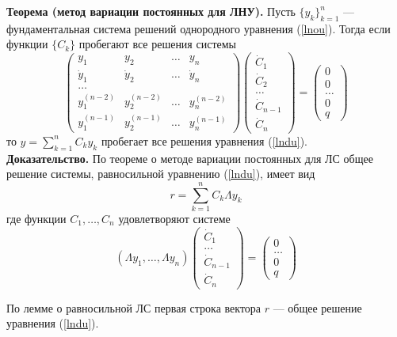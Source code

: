 \noindent \textbf{Теорема (метод вариации постоянных для ЛНУ).} Пусть $\{y_k\}_{k=1}^n$ --- фундаментальная система решений однородного уравнения (\ref{lnou}). Тогда если функции $\{C_k\}$ пробегают все решения системы
\begin{equation*}
    \begin{pmatrix}
    y_1 & y_2 & \ldots & y_n\\
    \dot{y}_1 & \dot{y}_2 & \ldots & \dot{y}_n\\
    \ldots\\
    y_1^{(n-2)} & y_2^{(n-2)} & \ldots & y_n^{(n-2)}\\
    y_1^{(n-1)} & y_2^{(n-1)} & \ldots & y_n^{(n-1)}
    \end{pmatrix}
    \begin{pmatrix}
    \dot{C}_{1}\\
    \dot{C}_{2}\\
    \ldots\\
    \dot{C}_{n-1}\\
    \dot{C}_{n}
    \end{pmatrix}
    =
    \begin{pmatrix}
    0\\
    0\\
    \ldots\\
    0\\
    q
    \end{pmatrix}
\end{equation*}
то $y = \displaystyle\sum_{k = 1}^n C_ky_k$ пробегает все решения уравнения (\ref{lndu}).\\

\noindent \textbf{Доказательство.} По теореме о методе вариации постоянных для ЛС общее решение системы, равносильной уравнению (\ref{lndu}), имеет вид
\begin{equation*}
    r = \sum_{k=1}^n C_k \Lambda y_k
\end{equation*}
где функции $C_1, \ldots, C_n$ удовлетворяют системе
\begin{equation*}
    (\Lambda y_1, \ldots, \Lambda y_n)
    \begin{pmatrix}
    \dot{C}_{1}\\
    \ldots\\
    \dot{C}_{n-1}\\
    \dot{C}_{n}
    \end{pmatrix}
    =
    \begin{pmatrix}
    0\\
    \ldots\\
    0\\
    q
    \end{pmatrix}
\end{equation*}

По лемме о равносильной ЛС первая строка вектора $r$ --- общее решение уравнения (\ref{lndu}).
